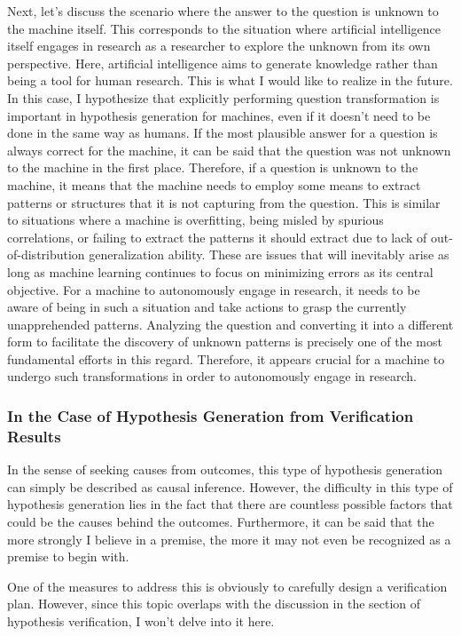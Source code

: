 \documentclass{article}
\begin{document}
Next, let's discuss the scenario where the answer to the question is unknown to the machine itself. This corresponds to the situation where artificial intelligence itself engages in research as a researcher to explore the unknown from its own perspective. Here, artificial intelligence aims to generate knowledge rather than being a tool for human research. This is what I would like to realize in the future. In this case, I hypothesize that explicitly performing question transformation is important in hypothesis generation for machines, even if it doesn't need to be done in the same way as humans. If the most plausible answer for a question is always correct for the machine, it can be said that the question was not unknown to the machine in the first place. Therefore, if a question is unknown to the machine, it means that the machine needs to employ some means to extract patterns or structures that it is not capturing from the question. This is similar to situations where a machine is overfitting, being misled by spurious correlations, or failing to extract the patterns it should extract due to lack of out-of-distribution generalization ability. These are issues that will inevitably arise as long as machine learning continues to focus on minimizing errors as its central objective. For a machine to autonomously engage in research, it needs to be aware of being in such a situation and take actions to grasp the currently unapprehended patterns. Analyzing the question and converting it into a different form to facilitate the discovery of unknown patterns is precisely one of the most fundamental efforts in this regard. Therefore, it appears crucial for a machine to undergo such transformations in order to autonomously engage in research.

\subsubsection{In the Case of Hypothesis Generation from Verification Results}
In the sense of seeking causes from outcomes, this type of hypothesis generation can simply be described as causal inference. However, the difficulty in this type of hypothesis generation lies in the fact that there are countless possible factors that could be the causes behind the outcomes. Furthermore, it can be said that the more strongly I believe in a premise, the more it may not even be recognized as a premise to begin with.

One of the measures to address this is obviously to carefully design a verification plan. However, since this topic overlaps with the discussion in the section of hypothesis verification, I won't delve into it here.
\end{document}
